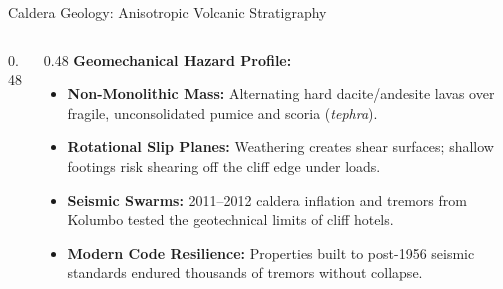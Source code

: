 \begin{frame}[label=geology]{Caldera Geology: Anisotropic Volcanic Stratigraphy}
  \begin{columns}[T, onlytextwidth]
    \begin{column}{0.48\textwidth}
    \end{column}

    \begin{column}{0.48\textwidth}
      \textbf{\color{aegeanblue}Geomechanical Hazard Profile:}
      \vspace{0.1em}
      \begin{itemize}
          \setlength{\itemsep}{0.08em}
        \item \textbf{Non-Monolithic Mass:} Alternating hard dacite/andesite lavas over fragile, unconsolidated pumice and scoria (\textit{tephra}).
        \item \textbf{Rotational Slip Planes:} Weathering creates shear surfaces; shallow footings risk shearing off the cliff edge under loads.
        \item \textbf{Seismic Swarms:} 2011--2012 caldera inflation and tremors from Kolumbo tested the geotechnical limits of cliff hotels.
        \item \textbf{Modern Code Resilience:} Properties built to post-1956 seismic standards endured thousands of tremors without collapse.
      \end{itemize}
    \end{column}
  \end{columns}
\end{frame}
